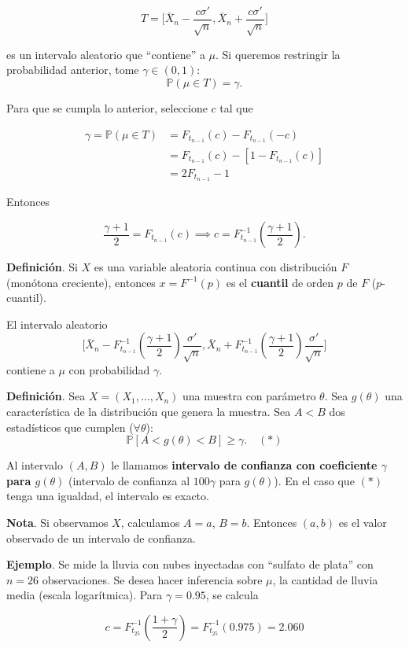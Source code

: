 \documentclass[
  12pt,
]{book}
\begin{document}
\[T = \bigg[\bar X_n - \dfrac{c\sigma'}{\sqrt n},\bar X_n +
\dfrac{c\sigma'}{\sqrt n}\bigg]\]

es un intervalo aleatorio que ``contiene'' a \(\mu\). Si queremos restringir la probabilidad anterior, tome \(\gamma \in (0,1)\):
\[\mathbb P(\mu\in T) = \gamma.\]

Para que se cumpla lo anterior, seleccione \(c\) tal que

\begin{align*} 
\gamma = \mathbb P( \mu \in T) &  = F_{t_{n-1}}(c)-F_{t_{n-1}}(-c) \\
& = F_{t_{n-1}}(c) - [1-F_{t_{n-1}}(c)]\\ 
& = 2F_{t_{n-1}} - 1 
\end{align*}

Entonces

\[\dfrac{\gamma+1}2 = F_{t_{n-1}}(c) \implies c = F_{t_{n-1}}^{-1}\left(\dfrac{\gamma+1}2 \right).\]

\textbf{Definición}. Si \(X\) es una variable aleatoria continua con distribución \(F\) (monótona creciente), entonces \(x=F^{-1}(p)\) es el \textbf{cuantil} de orden \(p\) de \(F\) (\(p\)-cuantil).

El intervalo aleatorio \[ \bigg[\bar X_n -
F_{t_{n-1}}^{-1}\left(\dfrac{\gamma+1}2 \right)\dfrac{\sigma'}{\sqrt n},\bar X_n
+ F_{t_{n-1}}^{-1}\left(\dfrac{\gamma+1}2 \right)\dfrac{\sigma'}{\sqrt
n}\bigg]\] contiene a \(\mu\) con probabilidad \(\gamma\).

\textbf{Definición}. Sea \(X = (X_1,\dots,X_n)\) una muestra con parámetro \(\theta\). Sea \(g(\theta)\) una característica de la distribución que genera la muestra. Sea \(A < B\) dos estadísticos que cumplen (\(\forall \theta\)):
\[\mathbb P [A<g(\theta)<B]\geq \gamma.\quad (*)\]

Al intervalo \((A,B)\) le llamamos \textbf{intervalo de confianza con coeficiente \(\gamma\) para \(g(\theta)\)} (intervalo
de confianza al \(100\gamma\) para \(g(\theta)\)). En el caso que \((*)\) tenga una igualdad, el intervalo es exacto.

\textbf{Nota}. Si observamos \(X\), calculamos \(A=a\), \(B=b\). Entonces \((a,b)\) es el valor observado de un intervalo de confianza.

\textbf{Ejemplo}. Se mide la lluvia con nubes inyectadas con ``sulfato de plata'' con \(n=26\) observaciones. Se desea hacer inferencia sobre \(\mu\), la cantidad de lluvia media (escala logarítmica). Para \(\gamma = 0.95\), se calcula

\[c=F^{-1}_{t_{25}}\left(\dfrac{1+\gamma}2\right) =F^{-1}_{t_{25}}(0.975) = 2.060 \]
\end{document}
